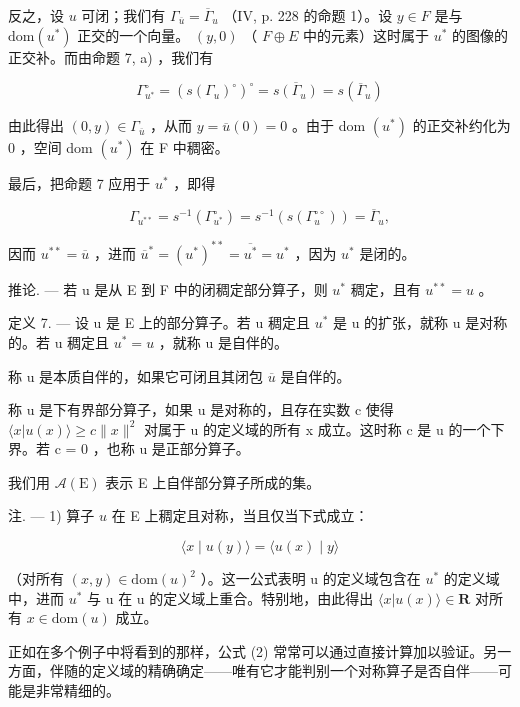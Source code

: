 反之，设 \(u\) 可闭；我们有 \(\Gamma_{\overline{u}} = \overline{\Gamma}_u\) （IV, p. 228 的命题 1）。设 \(y \in F\) 是与 \(\mathrm{dom}(u^*)\) 正交的一个向量。 \((y,0)\) （ \(F \oplus E\) 中的元素）这时属于 \(u^*\) 的图像的正交补。而由命题 7, a) ，我们有

\[
\Gamma_ {u ^ {*}} ^ {\circ} = (s (\Gamma_ {u}) ^ {\circ}) ^ {\circ} = \overline {{s (\Gamma_ {u})}} = s (\overline {{\Gamma}} _ {u})
\]

由此得出 \((0,y)\in\Gamma_{\overline{u}}\) ，从而 \(y=\overline{u}(0)=0\) 。由于 dom \((u^{*})\) 的正交补约化为 0 ，空间 dom \((u^{*})\) 在 F 中稠密。

最后，把命题 7 应用于 \(u^{*}\) ，即得

\[
\Gamma_ {u ^ {* *}} = s ^ {- 1} (\Gamma_ {u ^ {*}} ^ {\circ}) = s ^ {- 1} (s (\Gamma_ {u} ^ {\circ \circ})) = \overline {{\Gamma}} _ {u},
\]

因而 \(u^{**} = \overline{u}\) ，进而 \(\overline{u}^{*} = (u^{*})^{**} = \overline{u^{*}} = u^{*}\) ，因为 \(u^{*}\) 是闭的。

推论. --- 若 u 是从 E 到 F 中的闭稠定部分算子，则 \(u^{*}\) 稠定，且有 \(u^{**} = u\) 。

定义 7. --- 设 u 是 E 上的部分算子。若 u 稠定且 \(u^{*}\) 是 u 的扩张，就称 u 是对称的。若 u 稠定且 \(u^{*} = u\) ，就称 u 是自伴的。

称 u 是本质自伴的，如果它可闭且其闭包 \(\overline{u}\) 是自伴的。

称 u 是下有界部分算子，如果 u 是对称的，且存在实数 c 使得 \(\langle x | u(x) \rangle \geqslant c \|x\|^{2}\) 对属于 u 的定义域的所有 x 成立。这时称 c 是 u 的一个下界。若 c = 0 ，也称 u 是正部分算子。

我们用 \(\mathcal{A}(\mathrm{E})\) 表示 E 上自伴部分算子所成的集。

注. --- 1) 算子 \(u\) 在 E 上稠定且对称，当且仅当下式成立：

\[
\langle x \mid u (y) \rangle = \langle u (x) \mid y \rangle\tag{2}
\]

（对所有 \((x,y)\in\mathrm{dom}(u)^{2}\) ）。这一公式表明 u 的定义域包含在 \(u^{*}\) 的定义域中，进而 \(u^{*}\) 与 u 在 u 的定义域上重合。特别地，由此得出 \(\langle x|u(x)\rangle\in\mathbf{R}\) 对所有 \(x\in\mathrm{dom}(u)\) 成立。

正如在多个例子中将看到的那样，公式 (2) 常常可以通过直接计算加以验证。另一方面，伴随的定义域的精确确定——唯有它才能判别一个对称算子是否自伴——可能是非常精细的。

